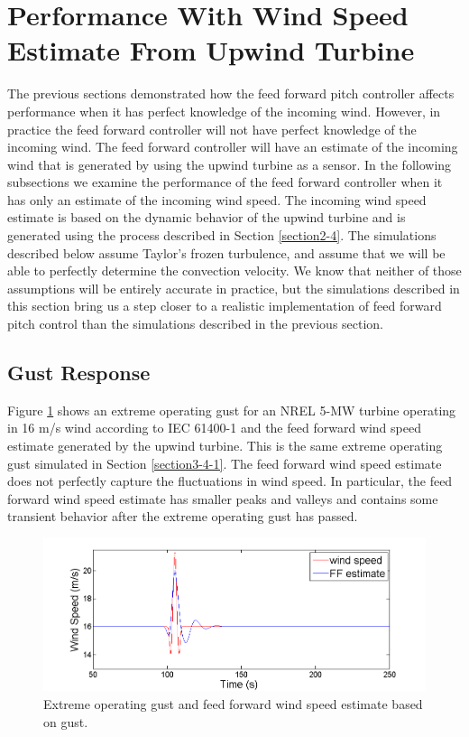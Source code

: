 \section{Performance With Wind Speed Estimate From Upwind Turbine} \label{section3-5}
The previous sections demonstrated how the feed forward pitch controller affects performance when it has perfect knowledge of the incoming wind. However, in practice the feed forward controller will not have perfect knowledge of the incoming wind. The feed forward controller will have an estimate of the incoming wind that is generated by using the upwind turbine as a sensor. In the following subsections we examine the performance of the feed forward controller when it has only an estimate of the incoming wind speed. The incoming wind speed estimate is based on the dynamic behavior of the upwind turbine and is generated using the process described in Section \ref{section2-4}. The simulations described below assume Taylor's frozen turbulence, and assume that we will be able to perfectly determine the convection velocity. We know that neither of those assumptions will be entirely accurate in practice, but the simulations described in this section bring us a step closer to a realistic implementation of feed forward pitch control than the simulations described in the previous section.

\subsection{Gust Response} \label{section3-5-1}
Figure \ref{fig3-24} shows an extreme operating gust for an NREL 5-MW turbine operating in 16 m/s wind according to IEC 61400-1 \cite{IEC2005} and the feed forward wind speed estimate generated by the upwind turbine. This is the same extreme operating gust simulated in Section \ref{section3-4-1}. The feed forward wind speed estimate does not perfectly capture the fluctuations in wind speed. In particular, the feed forward wind speed estimate has smaller peaks and valleys and contains some transient behavior after the extreme operating gust has passed.



\begin{figure}[htbp]
	\centering
		\includegraphics[width = \linewidth]{Figures/ch3Figures/fig3-24.png}
		
	\caption{Extreme operating gust and feed forward wind speed estimate based on gust.}
	\label{fig3-24}
\end{figure}


